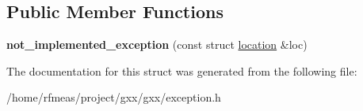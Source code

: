 \subsection*{Public Member Functions}
\begin{DoxyCompactItemize}
\item 
{\bfseries not\+\_\+implemented\+\_\+exception} (const struct \hyperlink{structlocation}{location} \&loc)\hypertarget{structgxx_1_1not__implemented__exception_aaaa89ffb1772f9088b5fcf73048b13f3}{}\label{structgxx_1_1not__implemented__exception_aaaa89ffb1772f9088b5fcf73048b13f3}

\end{DoxyCompactItemize}


The documentation for this struct was generated from the following file\+:\begin{DoxyCompactItemize}
\item 
/home/rfmeas/project/gxx/gxx/exception.\+h\end{DoxyCompactItemize}

